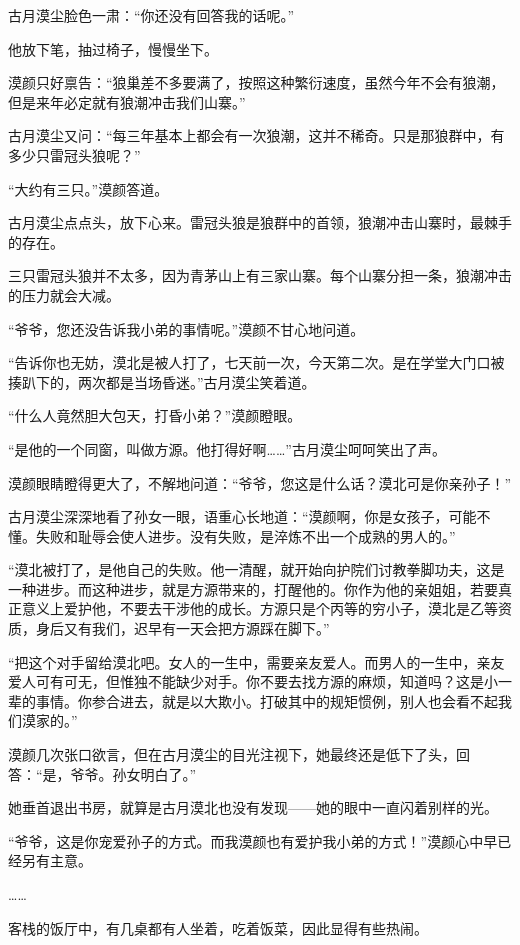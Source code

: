 \begin{this_body}
古月漠尘脸色一肃：“你还没有回答我的话呢。”

他放下笔，抽过椅子，慢慢坐下。

漠颜只好禀告：“狼巢差不多要满了，按照这种繁衍速度，虽然今年不会有狼潮，但是来年必定就有狼潮冲击我们山寨。”

古月漠尘又问：“每三年基本上都会有一次狼潮，这并不稀奇。只是那狼群中，有多少只雷冠头狼呢？”

“大约有三只。”漠颜答道。

古月漠尘点点头，放下心来。雷冠头狼是狼群中的首领，狼潮冲击山寨时，最棘手的存在。

三只雷冠头狼并不太多，因为青茅山上有三家山寨。每个山寨分担一条，狼潮冲击的压力就会大减。

“爷爷，您还没告诉我小弟的事情呢。”漠颜不甘心地问道。

“告诉你也无妨，漠北是被人打了，七天前一次，今天第二次。是在学堂大门口被揍趴下的，两次都是当场昏迷。”古月漠尘笑着道。

“什么人竟然胆大包天，打昏小弟？”漠颜瞪眼。

“是他的一个同窗，叫做方源。他打得好啊……”古月漠尘呵呵笑出了声。

漠颜眼睛瞪得更大了，不解地问道：“爷爷，您这是什么话？漠北可是你亲孙子！”

古月漠尘深深地看了孙女一眼，语重心长地道：“漠颜啊，你是女孩子，可能不懂。失败和耻辱会使人进步。没有失败，是淬炼不出一个成熟的男人的。”

“漠北被打了，是他自己的失败。他一清醒，就开始向护院们讨教拳脚功夫，这是一种进步。而这种进步，就是方源带来的，打醒他的。你作为他的亲姐姐，若要真正意义上爱护他，不要去干涉他的成长。方源只是个丙等的穷小子，漠北是乙等资质，身后又有我们，迟早有一天会把方源踩在脚下。”

“把这个对手留给漠北吧。女人的一生中，需要亲友爱人。而男人的一生中，亲友爱人可有可无，但惟独不能缺少对手。你不要去找方源的麻烦，知道吗？这是小一辈的事情。你参合进去，就是以大欺小。打破其中的规矩惯例，别人也会看不起我们漠家的。”

漠颜几次张口欲言，但在古月漠尘的目光注视下，她最终还是低下了头，回答：“是，爷爷。孙女明白了。”

她垂首退出书房，就算是古月漠北也没有发现——她的眼中一直闪着别样的光。

“爷爷，这是你宠爱孙子的方式。而我漠颜也有爱护我小弟的方式！”漠颜心中早已经另有主意。

……

客栈的饭厅中，有几桌都有人坐着，吃着饭菜，因此显得有些热闹。


\end{this_body}
